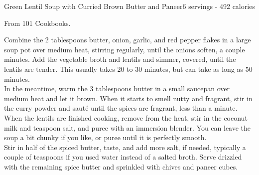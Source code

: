 \begin{recipe}{Green Lentil Soup with Curried Brown Butter and Paneer}{6 servings - 492 calories}{}

\freeform From 101 Cookbooks.


Combine the 2 tablespoons butter, onion, garlic, and red pepper flakes in a large soup pot over medium heat, stirring regularly, until the onions soften, a couple minutes. Add the vegetable broth and lentils and simmer, covered, until the lentils are tender. This usually takes 20 to 30 minutes, but can take as long as 50 minutes.\\

In the meantime, warm the 3 tablespoons butter in a small saucepan over medium heat and let it brown. When it starts to smell nutty and fragrant, stir in the curry powder and sauté until the spices are fragrant, less than a minute. When the lentils are finished cooking, remove from the heat, stir in the coconut milk and  teaspoon salt, and puree with an immersion blender. You can leave the soup a bit chunky if you like, or puree until it is perfectly smooth.\\

Stir in half of the spiced butter, taste, and add more salt, if needed, typically a couple of teaspoons if you used water instead of a salted broth. Serve drizzled with the remaining spice butter and sprinkled with chives and paneer cubes.
\end{recipe}